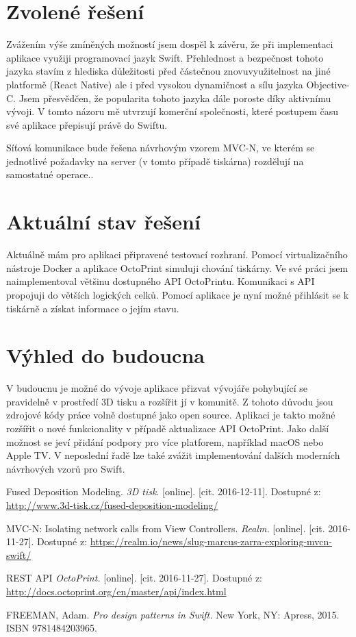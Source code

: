 \documentclass[czech]{article}
\begin{document}
\section{Zvolené řešení}

Zvážením výše zmíněných možností jsem dospěl k závěru, že při implementaci aplikace využiji programovací jazyk Swift. Přehlednost a bezpečnost tohoto jazyka stavím z hlediska důležitosti před částečnou znovuvyužitelnost na jiné platformě (React Native) ale i před vysokou dynamičnost a sílu jazyka Objective-C. Jsem přesvědčen, že popularita tohoto jazyka dále poroste díky aktivnímu vývoji. V tomto názoru mě utvrzují komerční společnosti, které postupem času své aplikace přepisují právě do Swiftu.

Síťová komunikace bude řešena návrhovým vzorem MVC-N, ve kterém se jednotlivé požadavky na server (v tomto případě tiskárna) rozdělují na samostatné operace.\cite{mvcn}.

\section{Aktuální stav řešení}

Aktuálně mám pro aplikaci připravené testovací rozhraní. Pomocí virtualizačního nástroje Docker a aplikace OctoPrint simuluji chování tiskárny. Ve své práci jsem naimplementoval většinu dostupného API OctoPrintu\cite{octoprint}. Komunikaci s API propojuji do větších logických celků. Pomocí aplikace je nyní možné přihlásit se k tiskárně a získat informace o jejím stavu.

\section{Výhled do budoucna}

V budoucnu je možné do vývoje aplikace přizvat vývojáře pohybující se pravidelně v prostředí 3D tisku a rozšířit jí v komunitě. Z tohoto důvodu jsou zdrojové kódy práce volně dostupné jako open source. Aplikaci je takto možné rozšířit o nové funkcionality v případě aktualizace API OctoPrint. Jako další možnost se jeví přidání podpory pro více platforem, například macOS nebo Apple TV. V neposlední řadě lze také zvážit implementování dalších moderních návrhových vzorů pro Swift\cite{design-patterns}.

\begin{thebibliography}{}

  Fused Deposition Modeling. \emph{3D tisk}. [online]. [cit. 2016-12-11]. Dostupné z: \url{http://www.3d-tisk.cz/fused-deposition-modeling/}

  MVC-N: Isolating network calls from View Controllers. \emph{Realm.} [online]. [cit. 2016-11-27]. Dostupné z: \url{https://realm.io/news/slug-marcus-zarra-exploring-mvcn-swift/}

  REST API \emph{OctoPrint.} [online]. [cit. 2016-11-27]. Dostupné z: \url{http://docs.octoprint.org/en/master/api/index.html}

  FREEMAN, Adam. \textit{Pro design patterns in Swift.} New York, NY: Apress, 2015. ISBN 9781484203965.

\end{thebibliography}

\newpage
\end{document}

